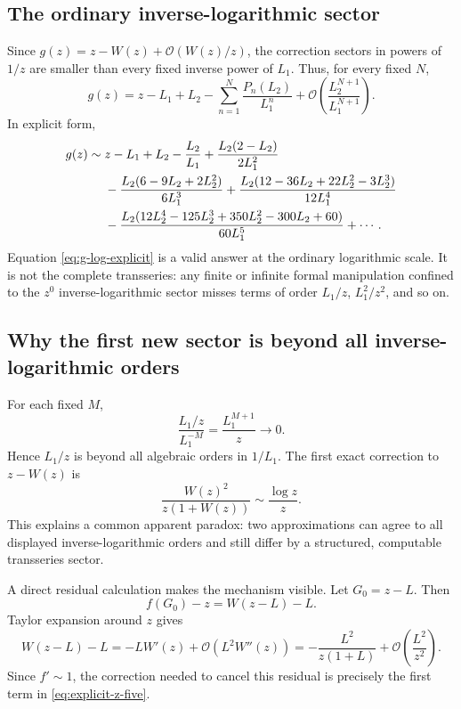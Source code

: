 \documentclass[11pt,a4paper]{article}
\numberwithin{equation}{section}
\theoremstyle{definition}
\theoremstyle{remark}
\newcommand{\Ord}{\mathcal O}
\newcommand{\Lone}{L_1}
\newcommand{\Ltwo}{L_2}
\begin{document}
\subsection{The ordinary inverse-logarithmic sector}

Since \(g(z)=z-W(z)+\Ord(W(z)/z)\), the correction sectors in powers of
\(1/z\) are smaller than every fixed inverse power of \(\Lone\).  Thus,
for every fixed \(N\),
\begin{equation}\label{eq:g-log-sector-general}
 g(z)=z-\Lone+\Ltwo-
 \sum_{n=1}^{N}\frac{P_n(\Ltwo)}{\Lone^n}
 +\Ord\!\left(\frac{\Ltwo^{N+1}}{\Lone^{N+1}}\right).
\end{equation}
In explicit form,
\begin{align}
 g(z)\sim{}&z-\Lone+\Ltwo-\frac{\Ltwo}{\Lone}
 +\frac{\Ltwo(2-\Ltwo)}{2\Lone^2}
 \notag\\
 &-\frac{\Ltwo(6-9\Ltwo+2\Ltwo^2)}{6\Lone^3}
 +\frac{\Ltwo(12-36\Ltwo+22\Ltwo^2-3\Ltwo^3)}{12\Lone^4}
 \notag\\
 &-\frac{\Ltwo(12\Ltwo^4-125\Ltwo^3+350\Ltwo^2-300\Ltwo+60)}
 {60\Lone^5}
 +\cdots.
 \label{eq:g-log-explicit}
\end{align}
Equation \eqref{eq:g-log-explicit} is a valid answer at the ordinary
logarithmic scale.  It is not the complete transseries: any finite or
infinite formal manipulation confined to the \(z^0\) inverse-logarithmic
sector misses terms of order \(\Lone/z\), \(\Lone^2/z^2\), and so on.

\subsection{Why the first new sector is beyond all inverse-logarithmic orders}

For each fixed \(M\),
\begin{equation}\label{eq:beyond-all-log}
  \frac{\Lone/z}{\Lone^{-M}}=\frac{\Lone^{M+1}}{z}\longrightarrow0.
\end{equation}
Hence \(\Lone/z\) is beyond all algebraic orders in \(1/\Lone\).  The
first exact correction to \(z-W(z)\) is
\begin{equation}\label{eq:first-beyond-log}
  \frac{W(z)^2}{z(1+W(z))}
  \sim\frac{\log z}{z}.
\end{equation}
This explains a common apparent paradox: two approximations can agree to
all displayed inverse-logarithmic orders and still differ by a structured,
computable transseries sector.

A direct residual calculation makes the mechanism visible.  Let
\(G_0=z-L\).  Then
\[
  f(G_0)-z=W(z-L)-L.
\]
Taylor expansion around \(z\) gives
\[
  W(z-L)-L=-LW'(z)+\Ord(L^2W''(z))
  =-\frac{L^2}{z(1+L)}+\Ord\!\left(\frac{L^2}{z^2}\right).
\]
Since \(f'\sim1\), the correction needed to cancel this residual is
precisely the first term in \eqref{eq:explicit-z-five}.
\end{document}
